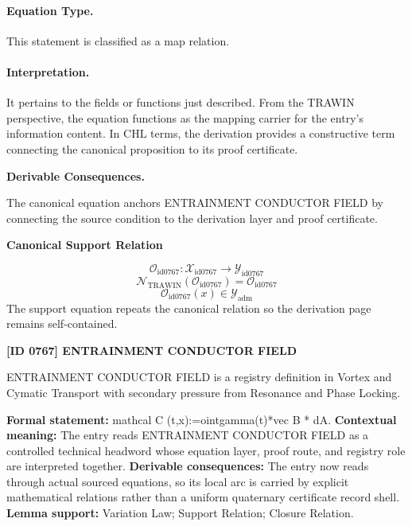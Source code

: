 \paragraph{Equation Type.}
This statement is classified as a map relation.

\paragraph{Interpretation.}
It pertains to the fields or functions just described. From the TRAWIN perspective, the equation functions as the mapping carrier for the entry’s information content. In CHL terms, the derivation provides a constructive term connecting the canonical proposition to its proof certificate.

\par\vspace{0.35em}
\noindent\textbf{Derivable Consequences.}\quad
\begingroup
\footnotesize
\raggedright
The canonical equation anchors ENTRAINMENT CONDUCTOR FIELD by connecting the source condition to the derivation layer and proof certificate.
\par\endgroup

\noindent\textbf{Canonical Support Relation}\par
\[
\mathcal{O}_{\mathrm{id0767}}:\mathcal{X}_{\mathrm{id0767}}\longrightarrow\mathcal{Y}_{\mathrm{id0767}}
\]
\[
\mathcal{N}_{\mathrm{TRAWIN}}(\mathcal{O}_{\mathrm{id0767}})=\mathcal{O}_{\mathrm{id0767}}
\]
\[
\mathcal{O}_{\mathrm{id0767}}(x)\in\mathcal{Y}_{\mathrm{adm}}
\]
\noindent The support equation repeats the canonical relation so the derivation page remains self-contained.\par

\clearpage
\noindent\textbf{[ID 0767] ENTRAINMENT CONDUCTOR FIELD}\par
\vspace{0.35em}
\begingroup\small
{}
ENTRAINMENT CONDUCTOR FIELD is a registry definition in Vortex and Cymatic Transport with secondary pressure from Resonance and Phase Locking.

\begingroup\footnotesize\setlength{\emergencystretch}{3em}\sloppy
\textbf{Formal statement:} mathcal C (t,x):=ointgamma(t)*vec B * dA. \textbf{Contextual meaning:} The entry reads ENTRAINMENT CONDUCTOR FIELD as a controlled technical headword whose equation layer, proof route, and registry role are interpreted together. \textbf{Derivable consequences:} The entry now reads through actual sourced equations, so its local arc is carried by explicit mathematical relations rather than a uniform quaternary certificate record shell. \textbf{Lemma support:} Variation Law; Support Relation; Closure Relation.\par
\endgroup


